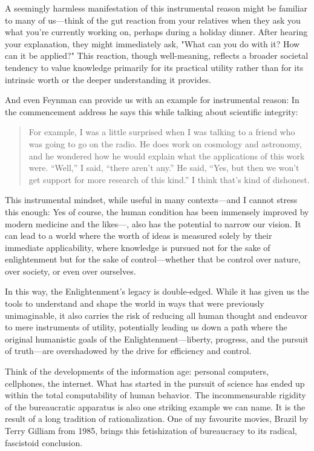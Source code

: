 A seemingly harmless manifestation of this instrumental reason might be
familiar to many of us—think of the gut reaction from your relatives when they
ask you what you’re currently working on, perhaps during a holiday dinner.
After hearing your explanation, they might immediately ask, "What can you do
with it? How can it be applied?" This reaction, though well-meaning, reflects a
broader societal tendency to value knowledge primarily for its practical
utility rather than for its intrinsic worth or the deeper understanding it
provides.

And even Feynman can provide us with an example for instrumental reason: In the
commencement address he says this while talking about scientific integrity:
\blockquote{ For
example, I was a little surprised when I was talking to a friend who was going
to go on the radio. He does work on cosmology and astronomy, and he wondered
how he would explain what the applications of this work were. \enquote{Well,}
I said, \enquote{there aren't any.} He said, \enquote{Yes, but then we won't
get support for more research of this kind.} I think that's kind of dishonest.}

This instrumental mindset, while useful in many contexts---and I cannot
stress this enough: Yes of course, the human condition has been immensely
improved by modern medicine and the likes---, also has the
potential to narrow our vision. It can lead to a world where the worth of ideas
is measured solely by their immediate applicability, where knowledge is pursued
not for the sake of enlightenment but for the sake of control—whether that be
control over nature, over society, or even over ourselves.

In this way, the Enlightenment's legacy is double-edged. While it has given us
the tools to understand and shape the world in ways that were previously
unimaginable, it also carries the risk of reducing all human thought and
endeavor to mere instruments of utility, potentially leading us down a path
where the original humanistic goals of the Enlightenment—liberty, progress, and
the pursuit of truth—are overshadowed by the drive for efficiency and control.

Think of the developments of the information age: personal computers,
cellphones, the internet. What has started in the pursuit of science has ended
up within the total computability of human behavior. The incommensurable
rigidity of the bureaucratic apparatus is also one striking example we can
name. It is the result of a long tradition of rationalization. One of my
favourite movies, Brazil by Terry Gilliam from 1985, brings this fetishization
of bureaucracy to its radical, fascistoid conclusion.

